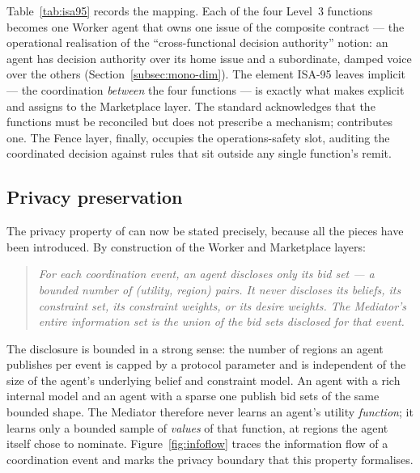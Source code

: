 Table~\ref{tab:isa95} records the mapping. Each of the four Level~3
functions becomes one Worker agent that owns one issue of the composite
contract --- the operational realisation of the ``cross-functional
decision authority'' notion: an agent has decision authority over its
home issue and a subordinate, damped voice over the others
(Section~\ref{subsec:mono-dim}). The element ISA-95 leaves implicit ---
the coordination \emph{between} the four functions --- is exactly what
\NEXUS{} makes explicit and assigns to the Marketplace layer. The
standard acknowledges that the functions must be reconciled but does
not prescribe a mechanism; \NEXUS{} contributes one. The Fence layer,
finally, occupies the operations-safety slot, auditing the coordinated
decision against rules that sit outside any single function's remit.

\subsection{Privacy preservation}
\label{sec:arch-privacy}
\label{subsec:privacy}

The privacy property of \NEXUS{} can now be stated precisely, because
all the pieces have been introduced. By construction of the Worker and
Marketplace layers:

\begin{quote}
\itshape
For each coordination event, an agent discloses only its bid set --- a
bounded number of (utility, region) pairs. It never discloses its
beliefs, its constraint set, its constraint weights, or its desire
weights. The Mediator's entire information set is the union of the bid
sets disclosed for that event.
\end{quote}

The disclosure is bounded in a strong sense: the number of regions an
agent publishes per event is capped by a protocol parameter and is
independent of the size of the agent's underlying belief and constraint
model. An agent with a rich internal model and an agent with a sparse
one publish bid sets of the same bounded shape. The Mediator therefore
never learns an agent's utility \emph{function}; it learns only a
bounded sample of \emph{values} of that function, at regions the agent
itself chose to nominate. Figure~\ref{fig:infoflow} traces the
information flow of a coordination event and marks the privacy boundary
that this property formalises.


